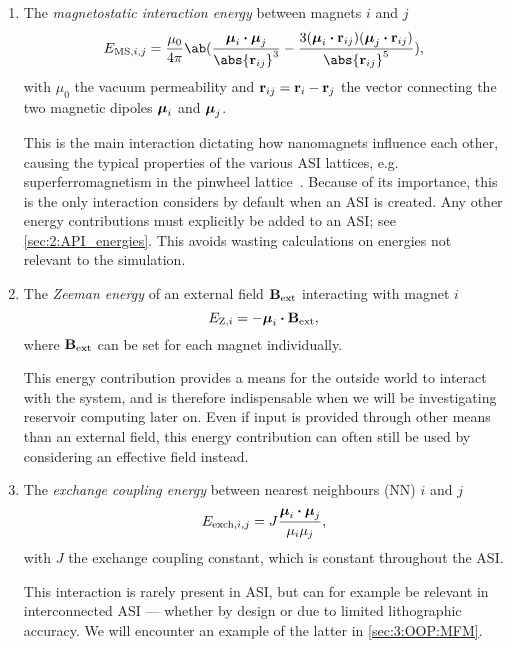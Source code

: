 \begin{enumerate}
	\item The \textit{magnetostatic interaction energy} between magnets $i$ and $j$
	\begin{equation}
		E_{\mathrm{MS},i,j} = \frac{\mu_0}{4 \pi} \ab(\frac{\vc{\mu}_i \bcdot \vc{\mu}_j}{\abs{\vc{r}_{ij}}^3} - \frac{3(\vc{\mu}_i \bcdot \vc{r}_{ij}) (\vc{\mu}_j \bcdot \vc{r}_{ij})}{\abs{\vc{r}_{ij}}^5}) \mathrm{,}
		\label{eq:E_MS}
	\end{equation}
	with $\mu_0$ the vacuum permeability and $\boldsymbol{\mathbf{r}}_{ij} = \boldsymbol{\mathbf{r}}_i - \boldsymbol{\mathbf{r}}_j$ the vector connecting the two magnetic dipoles $\boldsymbol{\mathbf{\mu}}_i$ and $\boldsymbol{\mathbf{\mu}}_j$. \par
	This is the main interaction dictating how nanomagnets influence each other, causing the typical properties of the various ASI lattices, e.g. superferromagnetism in the pinwheel lattice~\cite{li2018pinwheel}.
	Because of its importance, this is the only interaction \hotspice considers by default when an ASI is created.
	Any other energy contributions must explicitly be added to an ASI; see \cref{sec:2:API_energies}.
	This avoids wasting calculations on energies not relevant to the simulation.
	
	\item The \textit{Zeeman energy} of an external field $\boldsymbol{\mathbf{B}}_\mathrm{ext}$ interacting with magnet $i$
	\begin{equation}
		E_{\mathrm{Z},i} = -\boldsymbol{\mathbf{\mu}}_i \boldsymbol{\cdot} \boldsymbol{\mathbf{B}}_\mathrm{ext} \mathrm{,} \label{eq:E_Z}
	\end{equation}
	where $\boldsymbol{\mathbf{B}}_\mathrm{ext}$ can be set for each magnet individually. \par
	This energy contribution provides a means for the outside world to interact with the system, and is therefore indispensable when we will be investigating reservoir computing later on.
	Even if input is provided through other means than an external field, this energy contribution can often still be used by considering an effective field instead.
	
	\item The \textit{exchange coupling energy} between nearest neighbours (NN) $i$ and $j$
	\begin{equation}
		E_{\mathrm{exch},i,j} = J \frac{\boldsymbol{\mathbf{\mu}}_i \boldsymbol{\cdot} \boldsymbol{\mathbf{\mu}}_j}{\mu_i \mu_j} \mathrm{,} \label{eq:E_exch}
	\end{equation}
	with $J$ the exchange coupling constant, which is constant throughout the ASI. \par
	This interaction is rarely present in ASI, but can for example be relevant in interconnected ASI --- whether by design or due to limited lithographic accuracy.
	We will encounter an example of the latter in \cref{sec:3:OOP:MFM}.
\end{enumerate}

